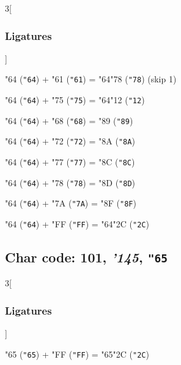 \documentclass{article}
\newlength{\maxcharwidth}
\begin{document}
\begin{multicols}{3}[\subsubsection{Ligatures}]

{\testfont\char"64\noboundary} ({\tt"64}) + {\testfont\char"61\noboundary} ({\tt"61}) = {\testfont\char"64\noboundary}{\testfont\char"78\noboundary} ({\tt"78})  (skip 1)

{\testfont\char"64\noboundary} ({\tt"64}) + {\testfont\char"75\noboundary} ({\tt"75}) = {\testfont\char"64\noboundary}{\testfont\char"12\noboundary} ({\tt"12}) 

{\testfont\char"64\noboundary} ({\tt"64}) + {\testfont\char"68\noboundary} ({\tt"68}) = {\testfont\char"89\noboundary} ({\tt"89}) 

{\testfont\char"64\noboundary} ({\tt"64}) + {\testfont\char"72\noboundary} ({\tt"72}) = {\testfont\char"8A\noboundary} ({\tt"8A}) 

{\testfont\char"64\noboundary} ({\tt"64}) + {\testfont\char"77\noboundary} ({\tt"77}) = {\testfont\char"8C\noboundary} ({\tt"8C}) 

{\testfont\char"64\noboundary} ({\tt"64}) + {\testfont\char"78\noboundary} ({\tt"78}) = {\testfont\char"8D\noboundary} ({\tt"8D}) 

{\testfont\char"64\noboundary} ({\tt"64}) + {\testfont\char"7A\noboundary} ({\tt"7A}) = {\testfont\char"8F\noboundary} ({\tt"8F}) 

{\testfont\char"64\noboundary} ({\tt"64}) + {\testfont\char"FF\noboundary} ({\tt"FF}) = {\testfont\char"64\noboundary}{\testfont\char"2C\noboundary} ({\tt"2C}) 

\end{multicols}

\subsection{Char code: 101, {\it'145}, {\tt"65}}
\label{char_101}


\begin{multicols}{3}[\subsubsection{Ligatures}]

{\testfont\char"65\noboundary} ({\tt"65}) + {\testfont\char"FF\noboundary} ({\tt"FF}) = {\testfont\char"65\noboundary}{\testfont\char"2C\noboundary} ({\tt"2C}) 

\end{multicols}
\end{document}

